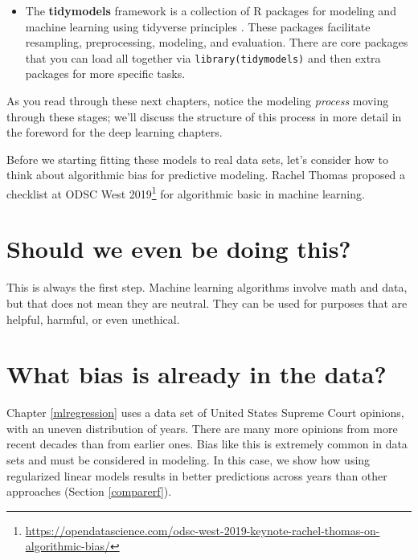 \documentclass[
]{krantz}
\DeclareRobustCommand{\href}[2]{#2\footnote{\url{#1}}}
\renewcommand{\href}[2]{#2\footnote{\url{#1}}}
\newenvironment{rmdblock}[1]
  {\begin{shaded*}
  \begin{itemize}[left = -1cm, labelsep = 1cm]
  \renewcommand{\labelitemi}{
    \raisebox{-.7\height}[0pt][0pt]{
      {\setkeys{Gin}{width=3em,keepaspectratio}\texttt{[image: images/\#1]}}
    }
  }
 
  \item
  }
  {
  \end{itemize}
  \end{shaded*}
  }
\newenvironment{rmdpackage}
  {\begin{rmdblock}{package}}
  {\end{rmdblock}}
\begin{document}
\begin{rmdpackage}
The \textbf{tidymodels} framework \citep{R-tidymodels} is a collection of R packages for modeling and machine learning using tidyverse principles \citep{Wickham2019}. These packages facilitate resampling, preprocessing, modeling, and evaluation. There are core packages that you can load all together via \texttt{library(tidymodels)} and then extra packages for more specific tasks.
\end{rmdpackage}

As you read through these next chapters, notice the modeling \emph{process} moving through these stages; we'll discuss the structure of this process in more detail in the foreword for the deep learning chapters.

Before we starting fitting these models to real data sets, let's consider how to think about algorithmic bias for predictive modeling.
Rachel Thomas proposed a checklist at \href{https://opendatascience.com/odsc-west-2019-keynote-rachel-thomas-on-algorithmic-bias/}{ODSC West 2019} for algorithmic basic in machine learning.

\hypertarget{should-we-even-be-doing-this}{%
\section*{Should we even be doing this?}\label{should-we-even-be-doing-this}}


\thispagestyle{myheadings}

This is always the first step. Machine learning algorithms involve math and data, but that does not mean they are neutral. They can be used for purposes that are helpful, harmful, or even unethical.

\hypertarget{what-bias-is-already-in-the-data}{%
\section*{What bias is already in the data?}\label{what-bias-is-already-in-the-data}}


Chapter \ref{mlregression} uses a data set of United States Supreme Court opinions, with an uneven distribution of years. There are many more opinions from more recent decades than from earlier ones. Bias like this is extremely common in data sets and must be considered in modeling. In this case, we show how using regularized linear models results in better predictions across years than other approaches (Section \ref{comparerf}).
\end{document}

